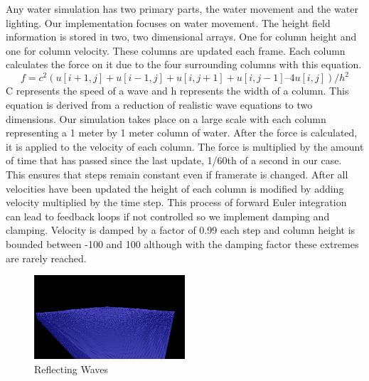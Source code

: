 \documentclass[12pt,notitlepage]{article}
\begin{document}
Any water simulation has two primary parts, the water movement and the water 
lighting.  Our implementation focuses on water movement.  The height field 
information is stored in two, two dimensional arrays.  One for column height 
and one for column velocity.  These columns are updated each frame.  Each 
column calculates the force on it due to the four surrounding columns with this 
equation. \[ f = c^2 ( u[i+1,j] + u[i-1,j] + u[i,j+1] + u[i,j-1] – 4 u[i,j] 
)/h^2 \]  C 
represents the speed of a wave and h represents the width of a column.  This 
equation is derived from a reduction of realistic wave equations to two 
dimensions.  Our simulation takes place on a large scale with each column 
representing a 1 meter by 1 meter column of water.  After the force is 
calculated, it is applied to the velocity of each column.  The force is 
multiplied by the amount of time that has passed since the last update, 1/60th 
of a second in our case.  This ensures that steps remain constant even if 
framerate is changed.  After all velocities have been updated the height of 
each column is modified by adding velocity multiplied by the time step.  This 
process of forward Euler integration can lead to feedback loops if not 
controlled so we implement damping and clamping.  Velocity is damped by a 
factor of 0.99 each step and column height is bounded between -100 and 100 
although with the damping factor these extremes are rarely reached.

\begin{figure}[H]
    \caption{Reflecting Waves}
    \label{fig:reflection}
    \centering
    \includegraphics[width=0.5\textwidth]{../www/images/bouncingWaves}
\end{figure}
	
\end{document}
